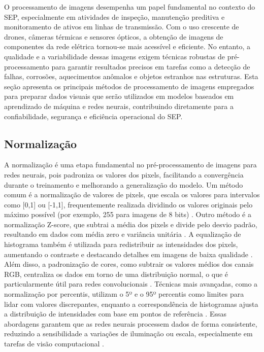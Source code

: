O processamento de imagens desempenha um papel fundamental no contexto do SEP, especialmente em atividades de inspeção, manutenção preditiva e monitoramento de ativos em linhas de transmissão. Com o uso crescente de drones, câmeras térmicas e sensores ópticos, a obtenção de imagens de componentes da rede elétrica tornou-se mais acessível e eficiente. No entanto, a qualidade e a variabilidade dessas imagens exigem técnicas robustas de pré-processamento para garantir resultados precisos em tarefas como a detecção de falhas, corrosões, aquecimentos anômalos e objetos estranhos nas estruturas. Esta seção apresenta os principais métodos de processamento de imagens empregados para preparar dados visuais que serão utilizados em modelos baseados em aprendizado de máquina e redes neurais, contribuindo diretamente para a confiabilidade, segurança e eficiência operacional do SEP.

\subsection{Normalização}
A normalização é uma etapa fundamental no pré-processamento de imagens para redes neurais, pois padroniza os valores dos pixels, facilitando a convergência durante o treinamento e melhorando a generalização do modelo. Um método comum é a normalização de valores de pixels, que escala os valores para intervalos como [0,1] ou [-1,1], frequentemente realizada dividindo os valores originais pelo máximo possível (por exemplo, 255 para imagens de 8 bits) \cite{sharma2024deep}. Outro método é a normalização Z-score, que subtrai a média dos pixels e divide pelo desvio padrão, resultando em dados com média zero e variância unitária \cite{chen2023robustness}. A equalização de histograma também é utilizada para redistribuir as intensidades dos pixels, aumentando o contraste e destacando detalhes em imagens de baixa qualidade \cite{chen2023robustness}. Além disso, a padronização de cores, como subtrair os valores médios dos canais RGB, centraliza os dados em torno de uma distribuição normal, o que é particularmente útil para redes convolucionais \cite{sciencedirect2023normalization}. Técnicas mais avançadas, como a normalização por percentis, utilizam o 5º e o 95º percentis como limites para lidar com valores discrepantes, enquanto a correspondência de histogramas ajusta a distribuição de intensidades com base em pontos de referência \cite{isola2023comparison}. Essas abordagens garantem que as redes neurais processem dados de forma consistente, reduzindo a sensibilidade a variações de iluminação ou escala, especialmente em tarefas de visão computacional \cite{sharma2024deep}.

